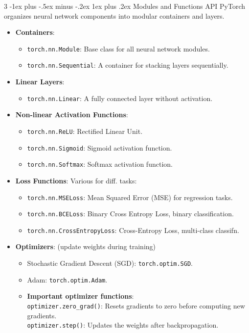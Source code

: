 \documentclass[a4paper, 9pt, landscape]{article}
\makeatletter
\renewcommand{\subsubsection}{\@startsection{subsubsection}{3}{0mm}%
                                {-1ex plus -.5ex minus -.2ex}%
                                {1ex plus .2ex}%
                                {\normalfont\small\bfseries}}
\makeatother
\begin{document}
\begin{multicols*}{3}
\subsubsection{Modules and Functions API}
PyTorch organizes neural network components into modular containers and layers.
\begin{itemize}
\item \textbf{Containers}:
\begin{itemize}
\item \texttt{torch.nn.Module}: Base class for all neural network modules.
\item \texttt{torch.nn.Sequential}: A container for stacking layers sequentially.
\end{itemize}
\item \textbf{Linear Layers}:
	\begin{itemize}
	\item \texttt{torch.nn.Linear}: A fully connected layer without activation.
	\end{itemize}
\item \textbf{Non-linear Activation Functions}:
	\begin{itemize}
	\item \texttt{torch.nn.ReLU}: Rectified Linear Unit.
	\item \texttt{torch.nn.Sigmoid}: Sigmoid activation function.
	\item \texttt{torch.nn.Softmax}: Softmax activation function.
	\end{itemize}
\item \textbf{Loss Functions}: Various for diff. tasks:
	\begin{itemize}
	\item \texttt{torch.nn.MSELoss}: Mean Squared Error (MSE) for regression tasks.
	\item \texttt{torch.nn.BCELoss}: Binary Cross Entropy Loss, binary classification.
	\item \texttt{torch.nn.CrossEntropyLoss}: Cross-Entropy Loss, multi-class classifn.
	\end{itemize}
\item \textbf{Optimizers}: (update weights during training)
	\begin{itemize}
	\item Stochastic Gradient Descent (SGD): \texttt{torch.optim.SGD}.
	\item Adam: \texttt{torch.optim.Adam}.
	\item \textbf{Important optimizer functions}: \\
	 \texttt{optimizer.zero\_grad()}: Resets gradients to zero before computing new gradients.\\
	  \texttt{optimizer.step()}: Updates the weights after backpropagation.
	\end{itemize}
\end{itemize}


\end{multicols*}
\end{document}
